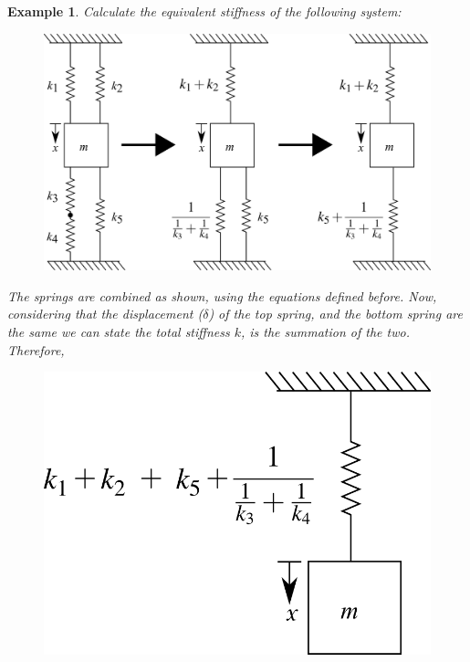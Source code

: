 \documentclass[12pt,letter]{article}
\newtheorem{ex}{Example}
\numberwithin{ex}{section} %
\newenvironment{example}{\begin{mdframed}[middlelinewidth=0.5mm]\begin{ex}\normalfont}{\end{ex}\end{mdframed}}
\numberwithin{re}{section} %
\begin{document}
			\begin{example}

				Calculate the equivalent stiffness of the following system:
				\begin{figure}[H]
					\centering
					\includegraphics[]{../figures/equivalent_mass_and_spring_system_1.png}
				\end{figure}	
				The springs are combined as shown, using the equations defined before.  Now, considering that the displacement ($\delta$) of the top spring, and the bottom spring are the same we can state the total stiffness $k$, is the summation of the two. Therefore,    
				\begin{figure}[H]
					\centering
					\includegraphics[]{../figures/equivalent_mass_and_spring_system_2.png}
				\end{figure}	

\end{example}
\end{document}
